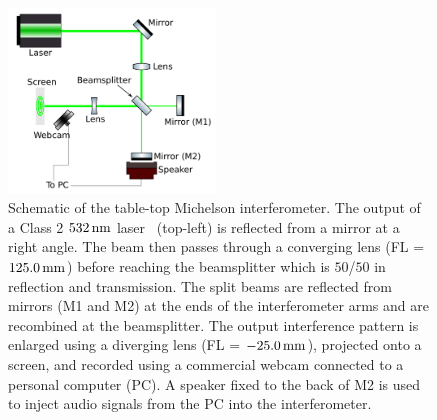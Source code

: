\documentclass[paper-main.tex]{subfiles}
\begin{document}
\begin{figure}
	\includegraphics[width=0.49\textwidth]{figures/ifo_schematic_webcam_edit.pdf}
	\caption{\label{fig:ifo_schematic_webcam}
Schematic of the table-top Michelson interferometer. 
The output of a Class 2 $532\,{\rm nm}$ laser~\cite{ThorLabsIFO} (top-left) is reflected from a mirror at a right angle. The beam then passes through a converging lens (FL = $125.0\,{\rm mm}$) before reaching the beamsplitter which is $50$/$50$ in reflection and transmission. 
The split beams are reflected from mirrors (M1 and M2) at the ends of the interferometer arms and are recombined at the beamsplitter. 
The output interference pattern is enlarged using a diverging lens (FL = $-25.0\,{\rm mm}$), projected onto a screen, and recorded using a commercial webcam connected to a personal computer (PC). 
A speaker fixed to the back of M2 is used to inject audio signals from the PC into the interferometer.
    }
\end{figure}
\end{document}
